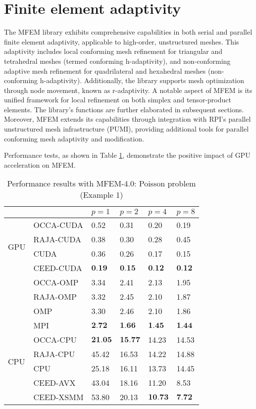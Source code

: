 \section{Finite element adaptivity}
The MFEM library exhibits comprehensive capabilities in both serial and parallel finite element adaptivity, applicable to high-order, unstructured meshes. This adaptivity includes local conforming mesh refinement for triangular and tetrahedral meshes (termed conforming h-adaptivity), and non-conforming adaptive mesh refinement for quadrilateral and hexahedral meshes (non-conforming h-adaptivity). Additionally, the library supports mesh optimization through node movement, known as r-adaptivity. A notable aspect of MFEM is its unified framework for local refinement on both simplex and tensor-product elements. The library's functions are further elaborated in subsequent sections. Moreover, MFEM extends its capabilities through integration with RPI’s parallel unstructured mesh infrastructure (PUMI), providing additional tools for parallel conforming mesh adaptivity and modification.


Performance tests, as shown in Table \ref{table_1}, demonstrate the positive impact of GPU acceleration on MFEM.

\begin{table}[H]
    \centering
    \begin{tabular}{llllll}
    \hline & & $p=1$ & $p=2$ & $p=4$ & $p=8$ \\
    \hline 
    \multirow{4}{*}{ GPU } & OCCA-CUDA & 0.52 & 0.31 & 0.20 & 0.19 \\
    & RAJA-CUDA & 0.38 & 0.30 & 0.28 & 0.45 \\
    & CUDA & 0.36 & 0.26 & 0.17 & 0.15 \\
    Multicore & CEED-CUDA & $\mathbf{0 . 1 9}$ & $\mathbf{0 . 1 5}$ & $\mathbf{0 . 1 2}$ & $\mathbf{0 . 1 2}$ \\
    \hline & OCCA-OMP & 3.34 & 2.41 & 2.13 & 1.95 \\
    & RAJA-OMP & 3.32 & 2.45 & 2.10 & 1.87 \\
    & OMP & 3.30 & 2.46 & 2.10 & 1.86 \\
    & MPI & $\mathbf{2 . 7 2}$ & $\mathbf{1 . 6 6}$ & $\mathbf{1 . 4 5}$ & $\mathbf{1 . 4 4}$ \\
    \hline 
    \multirow{4}{*}{ CPU } & OCCA-CPU & $\mathbf{2 1 . 0 5}$ & $\mathbf{1 5 . 7 7}$ & 14.23 & 14.53 \\
    & RAJA-CPU & 45.42 & 16.53 & 14.22 & 14.88 \\
    & CPU & 25.18 & 16.11 & 13.73 & 14.45 \\
    & CEED-AVX & 43.04 & 18.16 & 11.20 & 8.53 \\
    & CEED-XSMM & 53.80 & 20.13 & $\mathbf{1 0 . 7 3}$ & $\mathbf{7 . 7 2}$ \\
    \hline
    \end{tabular}
    \caption{Performance results with MFEM-4.0: Poisson problem (Example 1)}
    \label{table_1}
\end{table}

